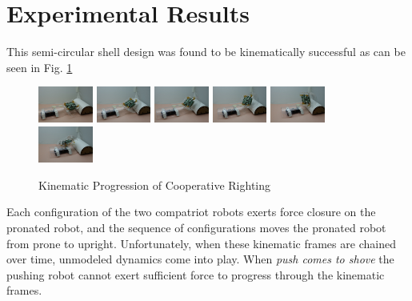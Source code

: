 \documentclass[letterpaper]{report}
\begin{document}
\section{Experimental Results}

This semi-circular shell design was found to be kinematically successful as can be seen in Fig. \ref{fig:KinematicFlipRealLife}

\begin{figure}[ht]
  \centering
  \includegraphics[width=0.16\textwidth]{KinPanel0.jpg}
  \includegraphics[width=0.16\textwidth]{KinPanel1.jpg}
  \includegraphics[width=0.16\textwidth]{KinPanel2.jpg}
  \includegraphics[width=0.16\textwidth]{KinPanel3.jpg}
  \includegraphics[width=0.16\textwidth]{KinPanel5.jpg}
  \includegraphics[width=0.16\textwidth]{KinPanel6.jpg}
  \caption{\label{fig:KinematicFlipRealLife}Kinematic Progression of Cooperative Righting}
\end{figure}

Each configuration of the two compatriot robots exerts force closure on the pronated robot, and the sequence of configurations moves the pronated robot from prone to upright.
Unfortunately, when these kinematic frames are chained over time, unmodeled dynamics come into play.
When \textit{push comes to shove} the pushing robot cannot exert sufficient force to progress through the kinematic frames.
\end{document}
